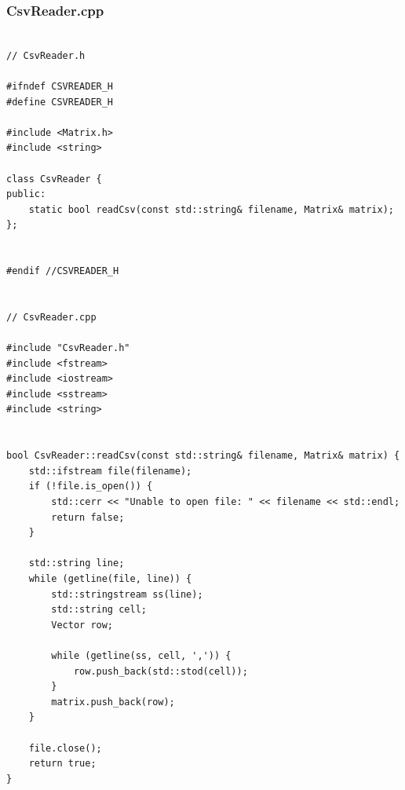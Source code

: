 \documentclass[12pt,twoside]{article}
\begin{document}
\subsubsection{CsvReader.cpp}
\scriptsize
\begin{verbatim}

// CsvReader.h

#ifndef CSVREADER_H
#define CSVREADER_H

#include <Matrix.h>
#include <string>

class CsvReader {
public:
    static bool readCsv(const std::string& filename, Matrix& matrix);
};


#endif //CSVREADER_H


// CsvReader.cpp

#include "CsvReader.h"
#include <fstream>
#include <iostream>
#include <sstream>
#include <string>


bool CsvReader::readCsv(const std::string& filename, Matrix& matrix) {
    std::ifstream file(filename);
    if (!file.is_open()) {
        std::cerr << "Unable to open file: " << filename << std::endl;
        return false;
    }

    std::string line;
    while (getline(file, line)) {
        std::stringstream ss(line);
        std::string cell;
        Vector row;

        while (getline(ss, cell, ',')) {
            row.push_back(std::stod(cell));
        }
        matrix.push_back(row);
    }

    file.close();
    return true;
}
\end{verbatim}
\end{document}
